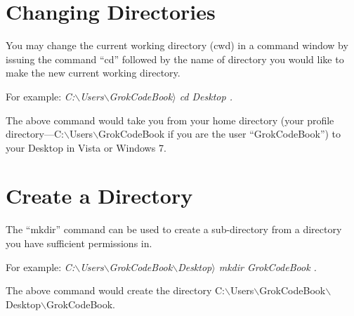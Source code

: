 \section{Changing Directories}\label{change-directories}
You may change the current working directory (cwd) in a command window by issuing the command ``cd'' followed by the name of directory you would like to make the new current working directory.

For example: \em C:$\backslash$Users$\backslash$GrokCodeBook$\rangle$ cd Desktop \em.

The above command would take you from your home directory (your profile directory---C:$\backslash$Users$\backslash$GrokCodeBook if you are the user ``GrokCodeBook'') to your Desktop in Vista or Windows 7.

\section{Create a Directory}\label{create-directory}
The ``mkdir'' command can be used to create a sub-directory from a directory you have sufficient permissions in.

For example: \em C:$\backslash$Users$\backslash$GrokCodeBook$\backslash$Desktop$\rangle$ mkdir GrokCodeBook \em.

The above command would create the directory C:$\backslash$Users$\backslash$GrokCodeBook$\backslash$Desktop$\backslash$GrokCodeBook.